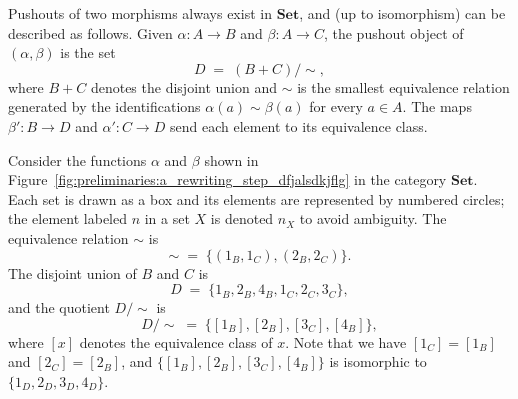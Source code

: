 \begin{example}
     Pushouts of two morphisms always exist in \(\mathbf{Set}\), and (up to isomorphism) can be described as follows. Given
    \(\alpha \colon A\to B\) and \( \beta \colon A\to C\), the pushout object of \((\alpha,\beta)\) is the set
    \[
    D \;=\; (B + C)/{\sim},
    \]
    where \(B + C\) denotes the disjoint union and \(\sim\) is the smallest equivalence relation generated by the identifications \(\alpha(a)\sim \beta(a)\) for every \(a\in A\). The maps
    \(\beta' \colon B\to D\) and \(\alpha' \colon C\to D\) send each element to its equivalence class.

    Consider the functions \(\alpha\) and \(\beta\) shown in Figure~\ref{fig:preliminaries:a_rewriting_step_dfjalsdkjflg} in the category \(\mathbf{Set}\). Each set is drawn as a box and its elements are represented by numbered circles; the element labeled \(n\) in a set \(X\) is denoted \(n_X\) to avoid ambiguity. The equivalence relation \(\sim\) is
    \[
    \sim \;=\; \{(1_B,1_C),(2_B,2_C)\}.
    \]
    The disjoint union of \(B\) and \(C\) is
    \[
    D \;=\; \{1_B,2_B,4_B,1_C,2_C,3_C\},
    \]
    and the quotient \(D/{\sim}\) is
    \[
    D/{\sim} \;=\; \{[1_B],[2_B],[3_C],[4_B]\},
    \]
    where \([x]\) denotes the equivalence class of \(x\). Note that we have \([1_C]=[1_B]\) and \([2_C]=[2_B]\), and \(\{[1_B],[2_B],[3_C],[4_B]\}\) is isomorphic to \(\{1_D,2_D,3_D,4_D\}\).


\end{example}
